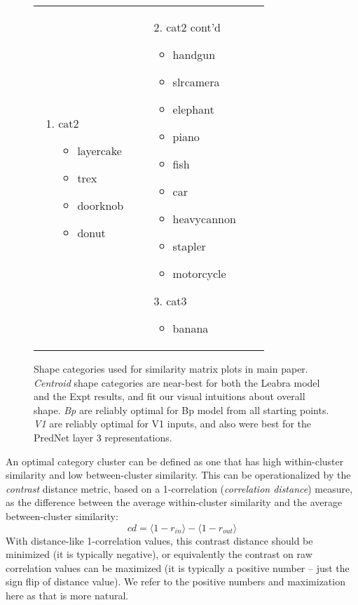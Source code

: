\documentclass[12pt,twoside]{article}
\newif\myifpdf
\begin{document}
\begin{figure}
\begin{tabular}{llll}
{\begin{enumerate}
\begin{itemize}
	\item tablelamp
	\item chair
	\end{itemize}
	\item cat2
	\begin{itemize}
	\item layercake
	\item trex
	\item doorknob
	\item donut
	\end{itemize}
	\end{enumerate}
	} & 
	 \parbox[t]{1.7in}{\raggedright 	\baselineskip0pt
	\begin{enumerate}
	\item[2.] cat2 cont'd
	\begin{itemize}
	\item handgun
	\item slrcamera
	\item elephant
	\item piano
	\item fish
	\item car
	\item heavycannon
	\item stapler
	\item motorcycle
	\end{itemize}
	\item[3.] cat3
	\begin{itemize}
	\item banana
	\end{itemize}
	\end{enumerate}
	}\\
	\end{tabular}
	\caption{Shape categories used for similarity matrix plots in main paper.  {\em Centroid} shape categories are near-best for both the Leabra model and the Expt results, and fit our visual intuitions about overall shape. {\em Bp} are reliably optimal for Bp model from all starting points.  {\em V1} are reliably optimal for V1 inputs, and also were best for the PredNet layer 3 representations.}
	\label{fig.cats}
\end{figure}

An optimal category cluster can be defined as one that has high within-cluster similarity and low between-cluster similarity.  This can be operationalized by the {\em contrast} distance metric, based on a 1-correlation ({\em correlation distance}) measure, as the difference between the average within-cluster similarity and the average between-cluster similarity:
\begin{equation}
 cd = \langle 1-r_{in} \rangle - \langle 1-r_{out} \rangle 
\end{equation}
With distance-like 1-correlation values, this contrast distance should be minimized (it is typically negative), or equivalently the contrast on raw correlation values can be maximized (it is typically a positive number -- just the sign flip of distance value).  We refer to the positive numbers and maximization here as that is more natural.
\end{document}
